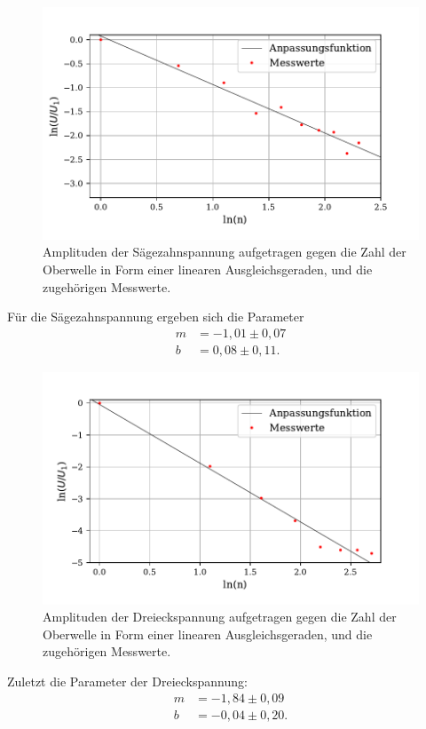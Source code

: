 \begin{figure}[H]
  \centering
  \includegraphics{plot2.pdf}
  \caption{Amplituden der Sägezahnspannung aufgetragen gegen die Zahl der Oberwelle in Form einer linearen Ausgleichsgeraden, und die zugehörigen Messwerte.}
  \label{fig:rechteck}
\end{figure}
Für die Sägezahnspannung ergeben sich die Parameter
\begin{align*}
  m &= -1,01 \pm 0,07 \\
  b &= 0,08 \pm 0,11 .
\end{align*}

\begin{figure}[H]
  \centering
  \includegraphics{plot3.pdf}
  \caption{Amplituden der Dreieckspannung aufgetragen gegen die Zahl der Oberwelle in Form einer linearen Ausgleichsgeraden, und die zugehörigen Messwerte.}
  \label{fig:rechteck}
\end{figure}
Zuletzt die Parameter der Dreieckspannung:
\begin{align*}
  m &= -1,84 \pm 0,09 \\
  b &= -0,04 \pm 0,20 .
\end{align*}


